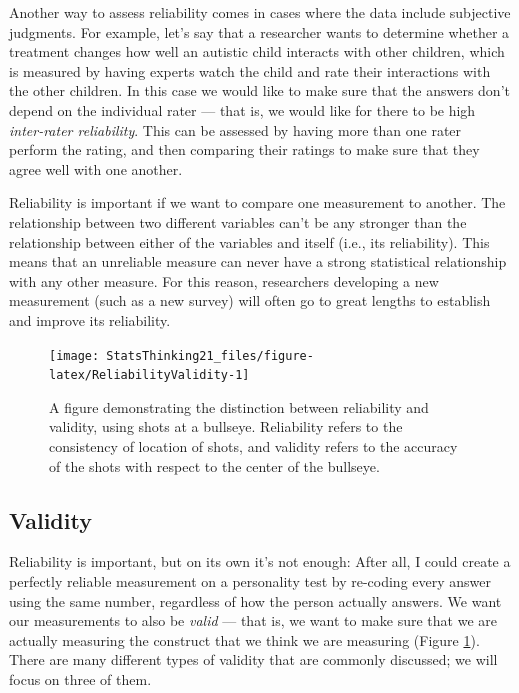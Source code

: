 \documentclass[12pt,]{book}
\theoremstyle{definition}
\theoremstyle{definition}
\theoremstyle{definition}
\theoremstyle{remark}
\begin{document}
Another way to assess reliability comes in cases where the data include subjective judgments. For example, let's say that a researcher wants to determine whether a treatment changes how well an autistic child interacts with other children, which is measured by having experts watch the child and rate their interactions with the other children. In this case we would like to make sure that the answers don't depend on the individual rater --- that is, we would like for there to be high \emph{inter-rater reliability}. This can be assessed by having more than one rater perform the rating, and then comparing their ratings to make sure that they agree well with one another.

Reliability is important if we want to compare one measurement to another. The relationship between two different variables can't be any stronger than the relationship between either of the variables and itself (i.e., its reliability). This means that an unreliable measure can never have a strong statistical relationship with any other measure. For this reason, researchers developing a new measurement (such as a new survey) will often go to great lengths to establish and improve its reliability.

\begin{figure}
\texttt{[image: StatsThinking21\_files/figure-latex/ReliabilityValidity-1]} \caption{A figure demonstrating the distinction between reliability and validity, using shots at a bullseye. Reliability refers to the consistency of location of shots, and validity refers to the accuracy of the shots with respect to the center of the bullseye. }\label{fig:ReliabilityValidity}
\end{figure}

\hypertarget{validity}{%
\subsection{Validity}\label{validity}}

Reliability is important, but on its own it's not enough: After all, I could create a perfectly reliable measurement on a personality test by re-coding every answer using the same number, regardless of how the person actually answers. We want our measurements to also be \emph{valid} --- that is, we want to make sure that we are actually measuring the construct that we think we are measuring (Figure \ref{fig:ReliabilityValidity}). There are many different types of validity that are commonly discussed; we will focus on three of them.
\end{document}
